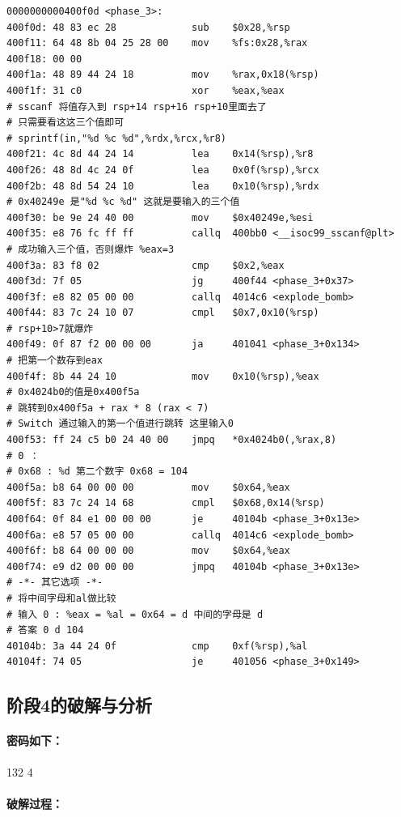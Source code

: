 \begin{lstlisting}
0000000000400f0d <phase_3>:
400f0d:	48 83 ec 28          	sub    $0x28,%rsp
400f11:	64 48 8b 04 25 28 00 	mov    %fs:0x28,%rax
400f18:	00 00 
400f1a:	48 89 44 24 18       	mov    %rax,0x18(%rsp)
400f1f:	31 c0                	xor    %eax,%eax
# sscanf 将值存入到 rsp+14 rsp+16 rsp+10里面去了
# 只需要看这这三个值即可
# sprintf(in,"%d %c %d",%rdx,%rcx,%r8)
400f21:	4c 8d 44 24 14       	lea    0x14(%rsp),%r8
400f26:	48 8d 4c 24 0f       	lea    0x0f(%rsp),%rcx
400f2b:	48 8d 54 24 10       	lea    0x10(%rsp),%rdx
# 0x40249e 是"%d %c %d" 这就是要输入的三个值
400f30:	be 9e 24 40 00       	mov    $0x40249e,%esi
400f35:	e8 76 fc ff ff       	callq  400bb0 <__isoc99_sscanf@plt>
# 成功输入三个值，否则爆炸 %eax=3
400f3a:	83 f8 02             	cmp    $0x2,%eax
400f3d:	7f 05                	jg     400f44 <phase_3+0x37>
400f3f:	e8 82 05 00 00       	callq  4014c6 <explode_bomb>
400f44:	83 7c 24 10 07       	cmpl   $0x7,0x10(%rsp)
# rsp+10>7就爆炸
400f49:	0f 87 f2 00 00 00    	ja     401041 <phase_3+0x134>
# 把第一个数存到eax
400f4f:	8b 44 24 10          	mov    0x10(%rsp),%eax
# 0x4024b0的值是0x400f5a 
# 跳转到0x400f5a + rax * 8 (rax < 7)
# Switch 通过输入的第一个值进行跳转 这里输入0
400f53:	ff 24 c5 b0 24 40 00 	jmpq   *0x4024b0(,%rax,8)
# 0 ：
# 0x68 : %d 第二个数字 0x68 = 104
400f5a:	b8 64 00 00 00       	mov    $0x64,%eax
400f5f:	83 7c 24 14 68       	cmpl   $0x68,0x14(%rsp)
400f64:	0f 84 e1 00 00 00    	je     40104b <phase_3+0x13e>
400f6a:	e8 57 05 00 00       	callq  4014c6 <explode_bomb>
400f6f:	b8 64 00 00 00       	mov    $0x64,%eax
400f74:	e9 d2 00 00 00       	jmpq   40104b <phase_3+0x13e>
# -*- 其它选项 -*-
# 将中间字母和al做比较
# 输入 0 : %eax = %al = 0x64 = d 中间的字母是 d
# 答案 0 d 104
40104b:	3a 44 24 0f          	cmp    0xf(%rsp),%al
40104f:	74 05                	je     401056 <phase_3+0x149>
\end{lstlisting}

\subsection{阶段4的破解与分析}

\paragraph{密码如下：}132 4

\paragraph{破解过程：}


